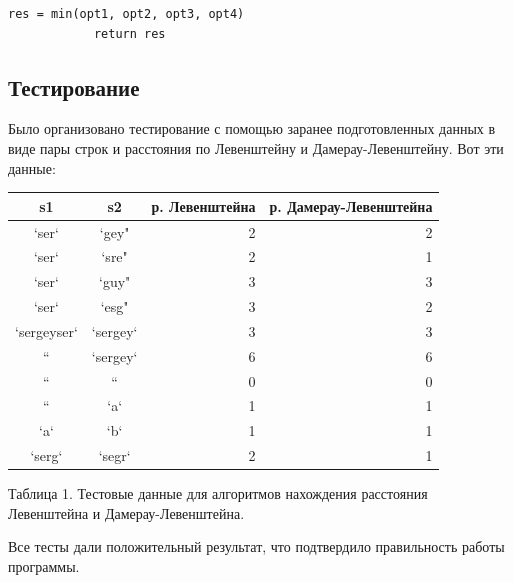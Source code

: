 \documentclass[a4paper,12pt]{report}
\begin{document}
\begin{center}
\begin{flushleft}
\begin{lstlisting}[label=some-code,caption=Функция нахождения расстояния Дамерау-Левенштейна рекурсивно]
			res = min(opt1, opt2, opt3, opt4)
			return res
        \end{lstlisting}
		\end{flushleft}
        
		\newpage
		
        \subsection{Тестирование}
        \begin{flushleft}
        \parindent=1cm
        Было организовано тестирование с помощью заранее подготовленных данных в виде пары строк и расстояния по Левенштейну и Дамерау-Левенштейну. Вот эти данные:\\
        \begin{tabular}{ | c | c | r | r | }
        \hline
s1 & s2 & р. Левенштейна & р. Дамерау-Левенштейна \\ \hline
`ser` & `gey" & 2 & 2\\
`ser` & `sre" & 2 & 1\\
`ser` & `guy" & 3 & 3\\
`ser` & `esg" & 3 & 2\\
`sergeyser` & `sergey` & 3 & 3\\
`` & `sergey` & 6 & 6\\
`` & `` & 0 & 0\\
`` & `a` & 1 & 1\\
`a` & `b` & 1 & 1\\
`serg` & `segr` & 2 & 1\\
\hline
        \end{tabular}
        	\begin{center}
  	Таблица 1. Тестовые данные для алгоритмов нахождения расстояния Левенштейна и Дамерау-Левенштейна.\\
	\end{center}
        
        Все тесты дали положительный результат, что подтвердило правильность работы программы.
                
        \end{flushleft}
    \end{center}
\end{document}
